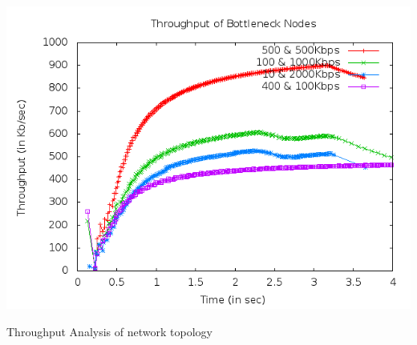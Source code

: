 \documentclass[a4paper,12pt]{report}
\begin{document}
\begin{center}
 \includegraphics[width=15 cm,height=18 cm]{./throughput.png}

Throughput Analysis of network topology
\end{center}
\end{document}
